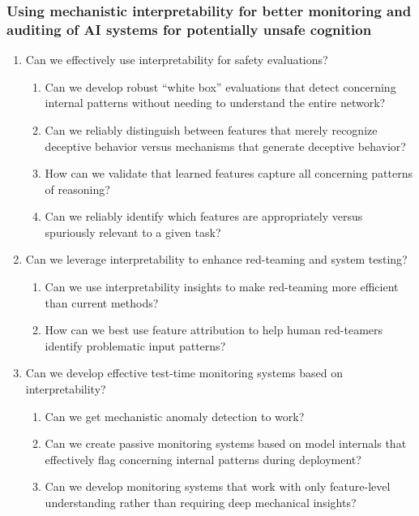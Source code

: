 \subsubsection{Using mechanistic interpretability for better monitoring and auditing of AI systems for potentially unsafe cognition}
\begin{enumerate}
    \item Can we effectively use interpretability for safety evaluations?
    \begin{enumerate}[label=\alph*.]
        \item Can we develop robust “white box” evaluations that detect concerning internal patterns without needing to understand the entire network?
        \item Can we reliably distinguish between features that merely recognize deceptive behavior versus mechanisms that generate deceptive behavior?
        \item How can we validate that learned features capture all concerning patterns of reasoning?
        \item Can we reliably identify which features are appropriately versus spuriously relevant to a given task?
    \end{enumerate}
    
    \item Can we leverage interpretability to enhance red-teaming and system testing?
    \begin{enumerate}[label=\alph*.]
        \item Can we use interpretability insights to make red-teaming more efficient than current methods?
        \item How can we best use feature attribution to help human red-teamers identify problematic input patterns?
    \end{enumerate}
    
    \item Can we develop effective test-time monitoring systems based on interpretability?
    \begin{enumerate}[label=\alph*.]
        \item Can we get mechanistic anomaly detection to work?
        \item Can we create passive monitoring systems based on model internals that effectively flag concerning internal patterns during deployment?
        \item Can we develop monitoring systems that work with only feature-level understanding rather than requiring deep mechanical insights?
    \end{enumerate}
\end{enumerate}

